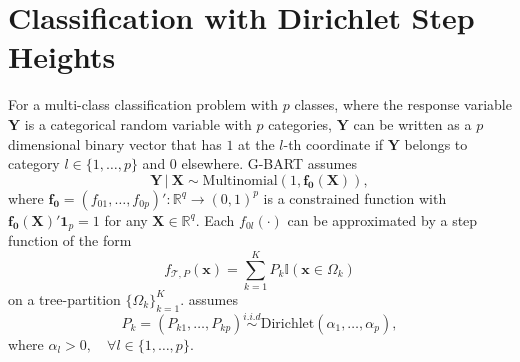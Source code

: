 \documentclass[12pt]{article}
\newcommand{\bm}[1]{\boldsymbol{#1}}
\newcommand{\Y}{\bm{Y}}
\newcommand{\mT}{\mathcal{T}}
\newcommand{\1}{\mathbb{I}}
\def\C {\,|\:}
\def\C {\,|\:}
\def\Y{\bm{Y}}
\def\X{\bm{X}}
\def\x{\bm{x}}
\def\C{\mbox{\boldmath$C$}}
\def\x{\mbox{\boldmath$x$}}
\def\X{\mbox{\boldmath$X$}}
\renewcommand{\Y}{\bm{Y}}
\def\C {\,|\:}
\def\C {\,|\:}
\def\X{\bm{X}}
\def\x{\bm{x}}
\theoremstyle{plain}
\theoremstyle{definition}
\theoremstyle{remark}
\begin{document}
\section{Classification with Dirichlet Step Heights}\label{sec:result_dirichlet}
For a multi-class classification problem with $p$ classes, where the response variable $\Y$ is a categorical random variable with $p$ categories, $\Y$ can be written as a $p$ dimensional binary vector that has $1$ at the $l$-th coordinate if $\Y$ belongs to category $l \in \{1,\dots,p\}$ and $0$ elsewhere. G-BART assumes
\begin{equation}
    \Y \C \X \sim \text{Multinomial}(1, \bm{f_0}(\X)),
\end{equation}
where $\bm{f_0} = \left (f_{01},\dots,f_{0p} \right )':\mathbb{R}^q \rightarrow (0,1)^p $ is a constrained function with $\bm{f_0}(\X)'\textbf{1}_p = 1$ for any $\X \in \mathbb{R}^q$. Each $f_{0l}(\cdot)$ can be approximated by a step function of the form
\begin{equation}\label{eq:tree_mapping_dirichlet}
f_{\mT,{P}}(\x)=\sum_{k=1}^K P_k\mathbb{I}(\x\in\Omega_k)
\end{equation}
on a tree-partition $\{\Omega_k\}_{k=1}^K$. \cite{denison1998bayesian} assumes
\begin{equation}\label{eq:dirichlet_dist}
    P_k = \left (P_{k1},\dots,P_{kp} \right ) \stackrel{i.i.d}{\sim} \text{Dirichlet}(\alpha_1,\dots,\alpha_p),
\end{equation}
where $\alpha_l > 0, \quad \forall l \in \{1,\dots,p\}$.
\end{document}
